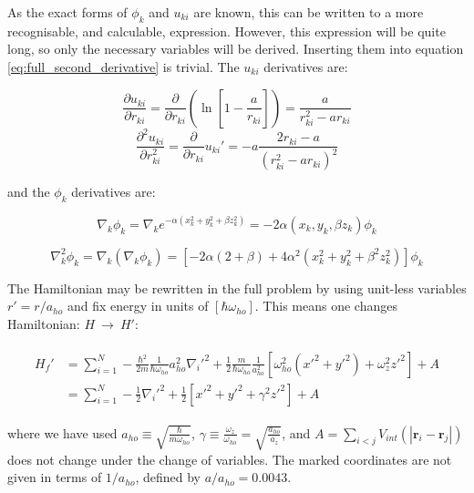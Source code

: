 \documentclass[english, a4paper]{article}
\newcommand{\bm}[1]{\mathbf{#1}}
\begin{document}
As the exact forms of $\phi_k$ and $u_{ki}$ are known, this can be written to a more recognisable, and calculable, expression. However, this expression will be quite long, so only the necessary variables will be derived. Inserting them into equation \ref{eq:full_second_derivative} is trivial. The $u_{ki}$ derivatives are:

\begin{equation}
	\frac{\partial u_{ki}}{\partial r_{ki}} = \frac{\partial}{\partial r_{ki}}\left(\ln\left[1-\frac{a}{r_{ki}}\right]\right) = \frac{a}{r_{ki}^2 - ar_{ki}}
\end{equation}
\begin{equation}
	\frac{\partial^2 u_{ki}}{\partial r_{ki}^2} = \frac{\partial}{\partial r_{ki}} u_{ki}' = -a\frac{2r_{ki} - a}{(r_{ki}^2 - ar_{ki})^2}
\end{equation}

and the $\phi_k$ derivatives are:

\begin{equation}
	\nabla_k\phi_k = \nabla_k e^{-\alpha(x_k^2 + y_k^2 + \beta z_k^2)} = -2\alpha(x_k,y_k,\beta z_k)\phi_k
\end{equation}

\begin{equation}
\nabla_k^2\phi_k = \nabla_k (\nabla_k\phi_k) = \left[-2\alpha(2+\beta) + 4\alpha^2(x_k^2 + y_k^2 + \beta^2 z_k^2)\right]\phi_k
\end{equation}

The Hamiltonian may be rewritten in the full problem by using unit-less variables $r' = r/a_{ho}$ and fix energy in units of $[\hbar\omega_{ho}]$. This means one changes Hamiltonian: $H\:\rightarrow\: H'$:

\begin{align}
	\begin{split}
	H_f' &= \sum_{i=1}^{N}-\frac{\hbar^2}{2m} \frac{1}{\hbar\omega_{ho}}a_{ho}^2\nabla_i'^2 + \frac{1}{2}\frac{m}{\hbar\omega_{ho}}\frac{1}{a_{ho}^2}\left[ \omega_{ho}^2(x'^2+y'^2) + \omega_z^2z'^2 \right] + A\\
	&= \sum_{i=1}^{N}-\frac{1}{2}\nabla_i'^2 + \frac{1}{2}\left[ x'^2+y'^2 + \gamma^2z'^2 \right] + A
	\end{split}
\end{align}

where we have used $a_{ho} \equiv \sqrt{\frac{\hbar}{m\omega_{ho}}}$, $\gamma \equiv \frac{\omega_z}{\omega_{ho}} = \sqrt{\frac{a_{ho}}{a_z}}$, and $A = \sum_{i<j} V_{int}(|\bm{r}_i-\bm{r}_j|)$ does not change under the change of variables. The marked coordinates are not given in terms of $1/a_{ho}$, defined by $a/a_{ho} = 0.0043$.
\end{document}
